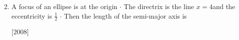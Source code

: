 \documentclass[journal,12pt,twocolumn]{IEEEtran}
\theoremstyle{remark}
\begin{document}
\begin{enumerate}
\begin{enumerate}[label=(\alph*)]
\begin{multicols}{2}
\end{multicols}
\end{enumerate}

\hfill

\item  A focus of an ellipse is at the origin {$ \cdot $} The directrix is the line {$ x = 4 $}and the eccentricity is {$ \frac{1}{2} $} {$ \cdot $} Then the length of the semi-major axis is 

\hfill
\hfill {[2008]}

\begin{enumerate}[label=(\alph*)]
\end{enumerate}

\hfill



\end{enumerate}
\end{document}
